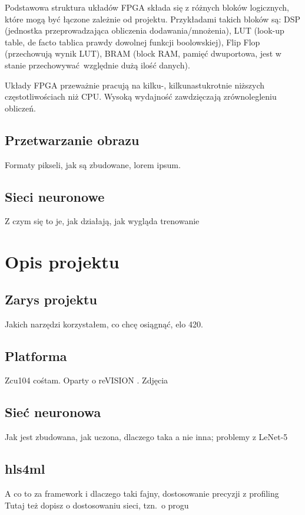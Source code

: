 \documentclass[12pt, oneside]{article}
\begin{document}
Podstawowa struktura układów FPGA składa się z różnych bloków logicznych,
które mogą być łączone zależnie od projektu. Przykładami takich bloków są:
DSP (jednostka przeprowadzająca obliczenia dodawania/mnożenia),
LUT (look-up table, de facto tablica prawdy dowolnej funkcji boolowskiej),
Flip Flop (przechowują wynik LUT), BRAM (block RAM, pamięć dwuportowa,
jest w stanie przechowywać względnie dużą ilość danych).

Układy FPGA przeważnie pracują na kilku-, kilkunastukrotnie niższych
częstotliwościach niż CPU. Wysoką wydajność zawdzięczają
zrównolegleniu obliczeń.

\subsection{Przetwarzanie obrazu}
Formaty pikseli, jak są zbudowane, lorem ipsum.

\subsection{Sieci neuronowe}
Z czym się to je, jak działają, jak wygląda trenowanie

\newpage
\section{Opis projektu}

\subsection{Zarys projektu}
Jakich narzędzi korzystałem, co chcę osiągnąć, elo 420.

\subsection{Platforma}
Zcu104 cośtam. Oparty o reVISION \texttrademark{}. Zdjęcia

\subsection{Sieć neuronowa}
Jak jest zbudowana, jak uczona, dlaczego taka a nie inna; problemy z LeNet-5

\subsection{hls4ml}
A co to za framework i dlaczego taki fajny, dostosowanie precyzji z profiling
Tutaj też dopisz o dostosowaniu sieci, tzn.\ o progu
\end{document}
